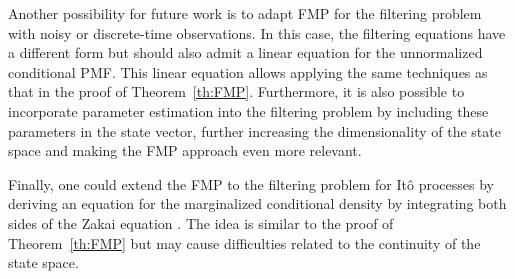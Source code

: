 Another possibility for future work is to adapt \ac{FMP} for the filtering problem with noisy or discrete-time observations. In this case, the filtering equations have a different form but should also admit a linear equation for the unnormalized conditional \ac{PMF}. This linear equation allows applying the same techniques as that in the proof of Theorem~\ref{th:FMP}. Furthermore, it is also possible to incorporate parameter estimation into the filtering problem by including these parameters in the state vector, further increasing the dimensionality of the state space and making the \ac{FMP} approach even more relevant. 

Finally, one could extend the \ac{FMP} to the filtering problem for It\^o processes by deriving an equation for the marginalized conditional density by integrating both sides of the Zakai equation \cite{Zakai1969Optimal}. The idea is similar to the proof of Theorem~\ref{th:FMP} but may cause difficulties related to the continuity of the state space.
